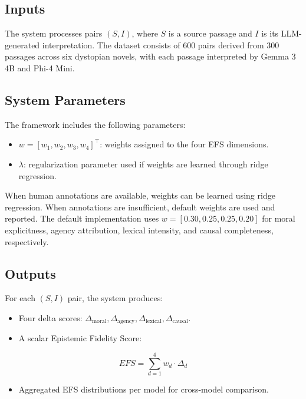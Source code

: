\documentclass[10pt, conference]{IEEEtran}
\begin{document}
\subsection{Inputs}

The system processes pairs $(S, I)$, where $S$ is a source passage and $I$ is its LLM-generated interpretation. The dataset consists of 600 pairs derived from 300 passages across six dystopian novels, with each passage interpreted by Gemma 3 4B and Phi-4 Mini.

\subsection{System Parameters}

The framework includes the following parameters:

\begin{itemize}
    \item $w = [w_1, w_2, w_3, w_4]^\top$: weights assigned to the four EFS dimensions.
    \item $\lambda$: regularization parameter used if weights are learned through ridge regression.
\end{itemize}

When human annotations are available, weights can be learned using ridge regression. When annotations are insufficient, default weights are used and reported. The default implementation uses $w=[0.30,0.25,0.25,0.20]$ for moral explicitness, agency attribution, lexical intensity, and causal completeness, respectively.

\subsection{Outputs}

For each $(S, I)$ pair, the system produces:

\begin{itemize}
    \item Four delta scores: $\Delta_{\text{moral}}, \Delta_{\text{agency}}, \Delta_{\text{lexical}}, \Delta_{\text{causal}}$.
    \item A scalar Epistemic Fidelity Score:
\end{itemize}

\[
EFS = \sum_{d=1}^{4} w_d \cdot \Delta_d
\]

\begin{itemize}
    \item Aggregated EFS distributions per model for cross-model comparison.
\end{itemize}
\end{document}
